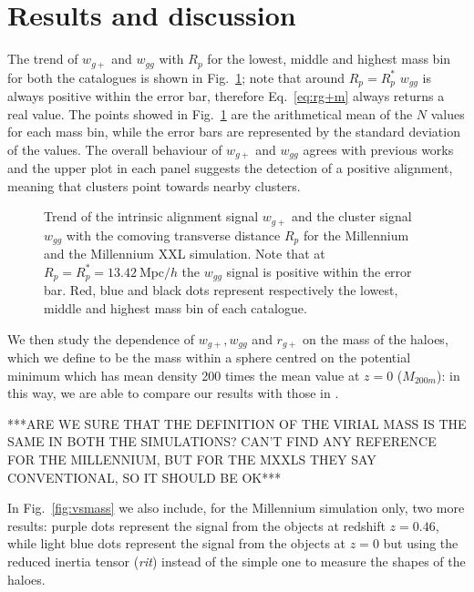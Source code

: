 \documentclass[a4paper,fleqn,usenatbib]{mnras}
\begin{document}
\section{Results and discussion}
\label{sec:resanddiscuss}
The trend of $w_{g+}$ and $w_{gg}$ with $R_p$ for the lowest, middle and highest mass bin for both the catalogues is shown in Fig.~\ref{fig:wgpwggrp}; note that around $R_p = R_p^*$ $w_{gg}$ is always positive within the error bar, therefore Eq.~\ref{eq:rg+m} always returns a real value.  The points showed in Fig.~\ref{fig:wgpwggrp} are the arithmetical mean of the $N$ values for each mass bin, while the error bars are represented by the standard deviation of the values.
The overall behaviour of $w_{g+}$ and $w_{gg}$ agrees with previous works \citep{Joachimietal2011, vanUitertJoachimi2017} and the upper plot in each panel suggests the detection of a positive alignment, meaning that clusters point towards nearby clusters.
\begin{figure}
	\centerline{
	}
	\centerline{
	}
	\caption{Trend of the intrinsic alignment signal $w_{g+}$ and the cluster signal $w_{gg}$ with the comoving transverse distance $R_p$ for \protect{} the Millennium and \protect{} the Millennium XXL simulation. Note that at $R_p = R_p^* = 13.42 \ \mbox{Mpc}/h$ the $w_{gg}$ signal is positive within the error bar. Red, blue and black dots represent respectively the lowest, middle and highest mass bin of each catalogue.}
	\label{fig:wgpwggrp}
\end{figure}

We then study the dependence of $w_{g+}, w_{gg}$ and $r_{g+}$ on the mass of the haloes, which we define to be the mass within a sphere centred on the potential minimum which has mean density 200 times the mean value at $z = 0$ ($M_{200m}$): in this way, we are able to compare our results with those in \citet[figure 7]{vanUitertJoachimi2017}.

***ARE WE SURE THAT THE DEFINITION OF THE VIRIAL MASS IS THE SAME IN BOTH THE SIMULATIONS? CAN'T FIND ANY REFERENCE FOR THE MILLENNIUM, BUT FOR THE MXXLS THEY SAY CONVENTIONAL, SO IT SHOULD BE OK***

In Fig.~\ref{fig:vsmass} we also include, for the Millennium simulation only, two more results: purple dots represent the signal from the objects at redshift $z = 0.46$, while light blue dots represent the signal from the objects at $z = 0$ but using the reduced inertia tensor (\textit{rit}) instead of the simple one to measure the shapes of the haloes.
\end{document}
